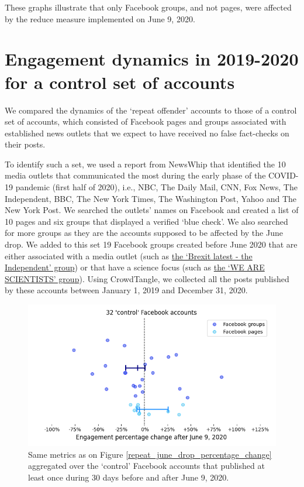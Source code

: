 \documentclass[review]{elsarticle}
\begin{document}
{{These graphs illustrate that only Facebook groups, and not pages, were affected by the reduce measure implemented on June 9, 2020.

\section*{Engagement dynamics in 2019-2020 for a control set of accounts}

We compared the dynamics of the `repeat offender' accounts to those of a control set of accounts, which consisted of Facebook pages and groups associated with established news outlets that we expect to have received no false fact-checks on their posts.

To identify such a set, we used a report from NewsWhip \citep{NewsWhipReport} that identified the 10 media outlets that communicated the most during the early phase of the COVID-19 pandemic (first half of 2020), i.e., NBC, The Daily Mail, CNN, Fox News, The Independent, BBC, The New York Times, The Washington Post, Yahoo and The New York Post.
We searched the outlets' names on Facebook and created a list of 10 pages and six groups that displayed a verified `blue check'.
We also searched for more groups as they are the accounts supposed to be affected by the June drop.
We added to this set 19 Facebook groups created before June 2020 that are either associated with a media outlet (such as \href{https://www.facebook.com/groups/brexitlatest/}{the `Brexit latest - the Independent' group}) or that have a science focus (such as \href{https://www.facebook.com/groups/437670336804119/}{the `WE ARE SCIENTISTS' group}).
Using CrowdTangle, we collected all the posts published by these accounts between January 1, 2019 and December 31, 2020.

\begin{figure}[!h]
\centering
\includegraphics[scale=0.5]{./../figure/supplementary_mainstream_june_drop_percentage_change.png}
\caption{
Same metrics as on Figure \ref{repeat_june_drop_percentage_change} aggregated over the `control' Facebook accounts that published at least once during 30 days before and after June 9, 2020.
}
\label{june_drop_control}
\end{figure}

}}
\end{document}
